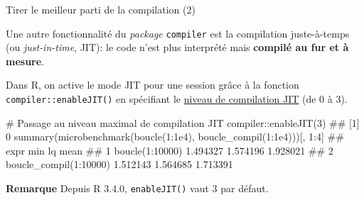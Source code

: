 \documentclass[12pt,ignorenonframetext,]{beamer}
\newenvironment{Shaded}{}{}
\newcommand{\KeywordTok}[1]{\textcolor[rgb]{0.00,0.00,1.00}{#1}}
\newcommand{\DecValTok}[1]{#1}
\newcommand{\FloatTok}[1]{#1}
\newcommand{\CommentTok}[1]{\textcolor[rgb]{0.00,0.50,0.00}{#1}}
\newcommand{\OperatorTok}[1]{#1}
\newcommand{\NormalTok}[1]{#1}
\renewenvironment{Shaded}{\begin{snugshade}}{\end{snugshade}}
\begin{document}
\begin{frame}[fragile]{Tirer le meilleur parti de la compilation (2)}

Une autre fonctionnalité du \emph{package} \texttt{compiler} est la
compilation \og juste-à-temps \fg{} (ou \textit{just-in-time}, JIT): le
code n'est plus interprété mais \textbf{compilé au fur et à mesure}.

\bigskip \pause Dans R, on active le mode JIT pour une session grâce à
la fonction \texttt{compiler::enableJIT()} en spécifiant le
\href{https://stat.ethz.ch/R-manual/R-devel/library/compiler/html/compile.html}{\underline{niveau de compilation JIT}}
(de 0 à 3).

\pause \footnotesize

\begin{Shaded}
\begin{Highlighting}[]
\CommentTok{# Passage au niveau maximal de compilation JIT}
\NormalTok{compiler}\OperatorTok{::}\KeywordTok{enableJIT}\NormalTok{(}\DecValTok{3}\NormalTok{)}
\NormalTok{  ## [1] 0}
\KeywordTok{summary}\NormalTok{(}\KeywordTok{microbenchmark}\NormalTok{(}\KeywordTok{boucle}\NormalTok{(}\DecValTok{1}\OperatorTok{:}\FloatTok{1e4}\NormalTok{), }\KeywordTok{boucle_compil}\NormalTok{(}\DecValTok{1}\OperatorTok{:}\FloatTok{1e4}\NormalTok{)))[, }\DecValTok{1}\OperatorTok{:}\DecValTok{4}\NormalTok{]}
\NormalTok{  ##                     expr      min       lq     mean}
\NormalTok{  ## 1        boucle(1:10000) 1.494327 1.574196 1.928021}
\NormalTok{  ## 2 boucle_compil(1:10000) 1.512143 1.564685 1.713391}
\end{Highlighting}
\end{Shaded}

\pause \small \textbf{Remarque} Depuis R 3.4.0, \texttt{enableJIT()}
vaut 3 par défaut.

\end{frame}
\end{document}
